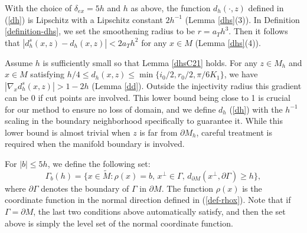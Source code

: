 \documentclass[11pt,letterpaper]{amsart}
\numberwithin{equation}{section}
\theoremstyle{definition}
\theoremstyle{plain}
\theoremstyle{definition}
\theoremstyle{plain}
\theoremstyle{definition}
\theoremstyle{plain}
\begin{document}
With the choice of $\delta_{ex}=5h$ and $h$ as above, the function $d_h(\cdot,z)$ defined in (\ref{dh}) is Lipschitz with a Lipschitz constant $2h^{-1}$ (Lemma \ref{dhs}(3)). In Definition \ref{definition-dhs}, we set the smoothening radius to be $r=a_T h^3$. Then it follows that $|d_h^s(x,z)-d_h(x,z)| < 2a_T h^2$ for any $x\in M$ (Lemma \ref{dhs}(4)).

Assume $h$ is sufficiently small so that Lemma \ref{dhsC21} holds. For any $z\in M_h$ and $x\in M$ satisfying $h/4\leqslant d_h (x,z)\leqslant \min\{i_0/2,r_0/2,\pi/6K_1\}$, we have $|\nabla_x d_h^s(x,z)|> 1-2h$ (Lemma \ref{dd}). Outside the injectivity radius this gradient can be 0 if cut points are involved. This lower bound being close to 1 is crucial for our method to ensure no loss of domain, and we define $d_h$ (\ref{dh}) with the $h^{-1}$ scaling in the boundary neighborhood specifically to guarantee it. While this lower bound is almost trivial when $z$ is far from $\partial M_h$, careful treatment is required when the manifold boundary is involved. 

\smallskip
For $|b|\leqslant 5h$, we define the following set:
\begin{equation}\label{Gammabh}
\Gamma_{b}(h)=\big\{x\in \widetilde{M}: \rho(x)=b, \, x^{\perp}\in \Gamma, \, d_{\partial M}(x^{\perp},\partial \Gamma)\geqslant h \big\},
\end{equation}
where $\partial \Gamma$ denotes the boundary of $\Gamma$ in $\partial M$. The function $\rho(x)$ is the coordinate function in the normal direction defined in (\ref{def-rhox}). Note that if $\Gamma=\partial M$, the last two conditions above automatically satisfy, and then the set above is simply the level set of the normal coordinate function.
\end{document}
